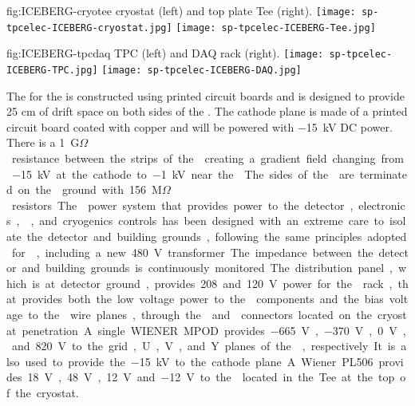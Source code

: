 \begin{dunefigure}
  {fig:ICEBERG-cryotee}
	{ cryostat (left) and top plate Tee (right).}
  \texttt{[image: sp-tpcelec-ICEBERG-cryostat.jpg]}
  \texttt{[image: sp-tpcelec-ICEBERG-Tee.jpg]}
\end{dunefigure}

\begin{dunefigure}
  {fig:ICEBERG-tpcdaq}
	{ TPC (left) and DAQ rack (right).}
  \texttt{[image: sp-tpcelec-ICEBERG-TPC.jpg]}
  \texttt{[image: sp-tpcelec-ICEBERG-DAQ.jpg]}
\end{dunefigure}

The  for the  is constructed using printed circuit boards and is 
designed to provide 25 cm of drift space on both sides of the . The cathode 
plane is made of a printed circuit board coated with copper and will be powered with 
\SI{-15}{kV} DC power. There is a \SI{1}{G$\Omega$} resistance between the strips of the 
creating a gradient field changing from \SI{-15}{kV} at the cathode to \SI{-1}{kV} near the 
. The sides of the  are terminated on the 
ground with \SI{156}{M$\Omega$} resistors. 

The  power system that provides power to the detector, electronics, 
, and cryogenics controls has been designed with an extreme care to 
isolate the detector and building grounds, following the same principles adopted
for , including a new 480~V transformer. The impedance between the detector
and building grounds is continuously monitored. The distribution panel, which is 
at detector ground, provides 208 and 120~V power for the  rack, that
provides both the low voltage power to the  components and the bias 
voltage to the  wire planes, through the  and 
connectors located on the cryostat penetration. A single WIENER MPOD  provides 
\SI{-665}{V}, \SI{-370}{V}, \SI{0}{V}, and \SI{820}{V} to the grid, U, V, and Y planes of the ,
respectively. It is also used to provide the \SI{-15}{kV} to the cathode plane. A Wiener 
PL506 provides \SI{18}{V}, \SI{48}{V}, \SI{12}{V} and \SI{-12}{V} to the  located in the Tee at the top of the cryostat. 

